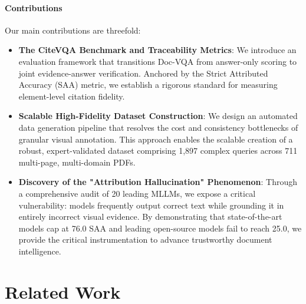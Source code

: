 \documentclass[]{opendatalab}
\begin{document}
\paragraph{Contributions} Our main contributions are threefold:
\begin{itemize}
 \item \textbf{The CiteVQA Benchmark and Traceability Metrics}: We introduce an evaluation framework that transitions Doc-VQA from answer-only scoring to joint evidence-answer verification. Anchored by the Strict Attributed Accuracy (SAA) metric, we establish a rigorous standard for measuring element-level citation fidelity.
 \item \textbf{Scalable High-Fidelity Dataset Construction}: We design an automated data generation pipeline that resolves the cost and consistency bottlenecks of granular visual annotation. This approach enables the scalable creation of a robust, expert-validated dataset comprising 1,897 complex queries across 711 multi-page, multi-domain PDFs.
 \item \textbf{Discovery of the "Attribution Hallucination" Phenomenon}: Through a comprehensive audit of 20 leading MLLMs, we expose a critical vulnerability: models frequently output correct text while grounding it in entirely incorrect visual evidence. By demonstrating that state-of-the-art models cap at 76.0 SAA and leading open-source models fail to reach 25.0, we provide the critical instrumentation to advance trustworthy document intelligence.
\end{itemize}

\section{Related Work}
\end{document}
